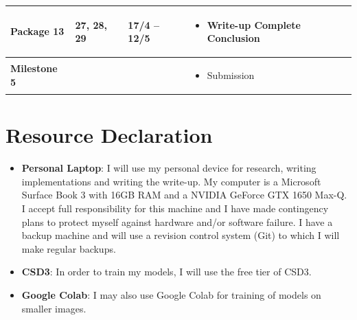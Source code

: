 \documentclass{article}
\begin{document}
\begin{longtable}{p{2.5cm}p{1.5cm}P{2.5cm}P{6.8cm}}
    Package 13 &
    27, 28, 29  &
    17/4 -- 12/5 &
    \begin{itemize}[label={--},noitemsep,leftmargin=*,topsep=0pt,partopsep=0pt]
      \item \textbf{Write-up} Complete Conclusion
    \end{itemize}\\
    \hline

    \textbf{Milestone 5} &
    &
    &
    \begin{itemize}[label={--},noitemsep,leftmargin=*,topsep=0pt,partopsep=0pt]
      \item Submission
    \end{itemize}\\

\bottomrule
\end{longtable}

\section{Resource Declaration}

\begin{itemize}
    \item \textbf{Personal Laptop}: I will use my personal device for research, writing implementations and writing the write-up. My computer is a Microsoft Surface Book 3 with 16GB RAM and a NVIDIA GeForce GTX 1650 Max-Q. I accept full responsibility for this machine and I have made contingency plans to protect myself against hardware and/or software failure. I have a backup machine and will use a revision control system (Git) to which I will make regular backups.
    \item \textbf{CSD3}: In order to train my models, I will use the free tier of CSD3.
    \item \textbf{Google Colab}: I may also use Google Colab for training of models on smaller images.
\end{itemize}

\newpage
\printbibliography[
heading=bibintoc,
title={References}
]
\end{document}

